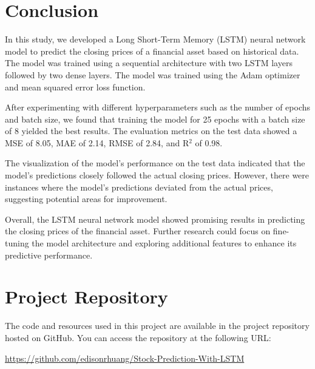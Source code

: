\documentclass[10pt,twocolumn,letterpaper]{article}
\begin{document}
\section{Conclusion}

In this study, we developed a Long Short-Term Memory (LSTM) neural 
network model to predict the closing prices of a financial asset based 
on historical data. The model was trained using a sequential architecture 
with two LSTM layers followed by two dense layers. The model was 
trained using the Adam optimizer and mean squared error loss function.

After experimenting with different hyperparameters such as the number 
of epochs and batch size, we found that training the model for 25 epochs 
with a batch size of 8 yielded the best results. The evaluation metrics on 
the test data showed a MSE of 8.05, MAE of 2.14, RMSE of 2.84, and R$^2$
of 0.98.

The visualization of the model's performance on the test data indicated that 
the model's predictions closely followed the actual closing prices. However, 
there were instances where the model's predictions deviated from the actual 
prices, suggesting potential areas for improvement.

Overall, the LSTM neural network model showed promising results in 
predicting the closing prices of the financial asset. Further research could 
focus on fine-tuning the model architecture and exploring additional 
features to enhance its predictive performance.


\section{Project Repository}

The code and resources used in this project are available in the project repository hosted on GitHub. You can access the repository at the following URL:

\url{https://github.com/edisonrhuang/Stock-Prediction-With-LSTM}

{\small


}
\end{document}
